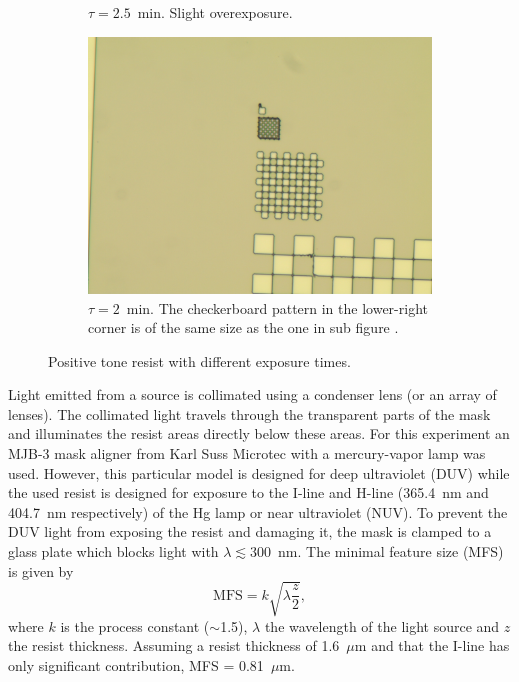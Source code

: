 \begin{figure}[!b]
\begin{subfigure}[t]{0.3\linewidth}
                    \caption{$\tau = 2.5$~min. Slight overexposure.}
                    \label{fig:b3e1}
                \end{subfigure}
                \hfill
                \begin{subfigure}[t]{0.3\linewidth}
                    \centering
                    \includegraphics[width=\textwidth]{data/b3a1.jpg}
                    \caption{$\tau = 2$~min. The checkerboard pattern in the lower-right corner is of the same size as the one in sub figure .}
                    \label{fig:b3a1}
                \end{subfigure}
                \caption{Positive tone resist with different exposure times.}
            \end{figure}
Light emitted from a source is collimated using a condenser lens (or an array of lenses). The collimated light travels through the transparent parts of the mask and illuminates the resist areas directly below these areas. For this experiment an MJB-3 mask aligner from Karl Suss Microtec with a mercury-vapor lamp was used. However, this particular model is designed for deep ultraviolet (DUV) while the used resist is designed for exposure to the I-line and H-line (365.4~nm and 404.7~nm respectively) of the Hg lamp or near ultraviolet (NUV). To prevent the DUV light from exposing the resist and damaging it, the mask is clamped to a glass plate which blocks light with $\lambda \lesssim 300$~nm. The minimal feature size (MFS) is given by
\begin{equation*}
    \text{MFS} = k\sqrt{\lambda \frac{z}{2}},
\end{equation*} where $k$ is the process constant ($\sim$1.5), $\lambda$ the wavelength of the light source and $z$ the resist thickness. Assuming a resist thickness of 1.6~$\mu$m and that the I-line has only significant contribution, MFS = 0.81~$\mu$m.

